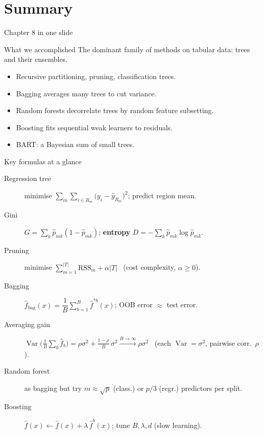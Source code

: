 \documentclass[aspectratio=169,11pt]{beamer}
\begin{document}
\section{Summary}

\begin{frame}{Chapter 8 in one slide}
  \begin{block}{What we accomplished}
    The dominant family of methods on tabular data: trees and their
    ensembles.
  \end{block}
  \begin{itemize}
    \item Recursive partitioning, pruning, classification trees.
    \item Bagging averages many trees to cut variance.
    \item Random forests decorrelate trees by random feature subsetting.
    \item Boosting fits sequential weak learners to residuals.
    \item BART: a Bayesian sum of small trees.
  \end{itemize}
\end{frame}

\begin{frame}{Key formulas at a glance}
  \footnotesize
  \begin{description}
    \item[Regression tree] minimise $\sum_{m}\sum_{i\in R_m}\big(y_i-\hat y_{R_m}\big)^2$; predict region mean.
    \item[Gini] $G=\sum_{k}\hat p_{mk}(1-\hat p_{mk})$; \quad \textbf{entropy} $D=-\sum_k \hat p_{mk}\log \hat p_{mk}$.
    \item[Pruning] minimise $\sum_{m=1}^{|T|}\mathrm{RSS}_m+\alpha|T|$ \ (cost complexity, $\alpha\ge0$).
    \item[Bagging] $\hat f_{\mathrm{bag}}(x)=\dfrac1B\sum_{b=1}^{B}\hat f^{*b}(x)$; OOB error $\approx$ test error.
    \item[Averaging gain] $\operatorname{Var}\!\big(\tfrac1B\sum_b \hat f_b\big)=\rho\sigma^2+\frac{1-\rho}{B}\,\sigma^2 \xrightarrow{B\to\infty} \rho\sigma^2$ \ (each $\operatorname{Var}=\sigma^2$, pairwise corr.\ $\rho$).
    \item[Random forest] as bagging but try $m\approx\sqrt{p}$ (class.) or $p/3$ (regr.) predictors per split.
    \item[Boosting] $\hat f(x)\leftarrow \hat f(x)+\lambda\,\hat f^{b}(x)$; tune $B,\lambda,d$ (slow learning).
  \end{description}
\end{frame}
\end{document}
